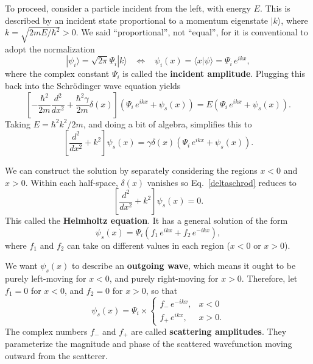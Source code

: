 \documentclass[pra,12pt]{revtex4}
\begin{document}
To proceed, consider a particle incident from the left, with energy
$E$.  This is described by an incident state proportional to a
momentum eigenstate $|k\rangle$, where $k = \sqrt{2mE/\hbar^2} > 0$.
We said ``proportional'', not ``equal'', for it is conventional to
adopt the normalization
\begin{equation}
  |\psi_i\rangle = \sqrt{2\pi}\Psi_i |k\rangle \;\;\; \Leftrightarrow\;\;\; \psi_i(x) = \langle x|\psi\rangle = \Psi_i \, e^{ik x},
\end{equation}
where the complex constant $\Psi_i$ is called the \textbf{incident
  amplitude}.  Plugging this back into the Schr\"odinger wave equation
yields
\begin{equation}
  \left[-\frac{\hbar^2}{2m} \frac{d^2}{dx^2} + \frac{\hbar^2\gamma}{2m}\delta(x)\right] \left(\Psi_i \, e^{ikx} + \psi_s(x) \right) = E \left(\Psi_i \, e^{ikx} + \psi_s(x) \right).
\end{equation}
Taking $E = \hbar^2k^2/2m$, and doing a bit of algebra, simplifies this to
\begin{equation}
  \left[ \frac{d^2}{dx^2} + k^2\right] \psi_s(x) =  \gamma \delta(x) \left(\Psi_i \, e^{ikx} + \psi_s(x) \right).
  \label{deltaschrod}
\end{equation}

We can construct the solution by separately considering the regions $x
< 0$ and $x > 0$.  Within each half-space, $\delta(x)$ vanishes so
Eq.~\eqref{deltaschrod} reduces to
\begin{equation}
  \left[\frac{d^2}{dx^2} + k^2\right] \psi_s(x) = 0.
\end{equation}
This called the \textbf{Helmholtz equation}.  It has a general
solution of the form
\begin{equation}
  \psi_s(x) = \Psi_i \left(f_1 \, e^{ik x} + f_2 \, e^{-ik x}\right),
\end{equation}
where $f_1$ and $f_2$ can take on different values in each region ($x
< 0$ or $x > 0$).

We want $\psi_s(x)$ to describe an \textbf{outgoing wave}, which means
it ought to be purely left-moving for $x < 0$, and purely right-moving
for $x > 0$.  Therefore, let $f_1 = 0$ for $x < 0$, and $f_2 = 0$ for
$x > 0$, so that
\begin{equation}
  \psi_s(x) = \Psi_i \times \begin{cases}f_- \,e^{-ikx}, & x < 0 \\ f_+ \,e^{ikx}, & x > 0.\end{cases}
\end{equation}
The complex numbers $f_-$ and $f_+$ are called \textbf{scattering
  amplitudes}.  They parameterize the magnitude and phase of the
scattered wavefunction moving outward from the scatterer.
\end{document}
